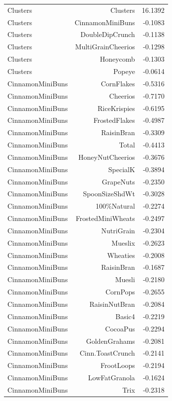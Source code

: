 \begin{longtable}{@{}lrr@{}}
Clusters & Clusters & 16.1392 \\
Clusters & CinnamonMiniBuns & -0.1083 \\
Clusters & DoubleDipCrunch & -0.1138 \\
Clusters & MultiGrainCheerios & -0.1298 \\
Clusters & Honeycomb & -0.1303 \\
Clusters & Popeye & -0.0614 \\
CinnamonMiniBuns & CornFlakes & -0.5316 \\
CinnamonMiniBuns & Cheerios & -0.7170 \\
CinnamonMiniBuns & RiceKrispies & -0.6195 \\
CinnamonMiniBuns & FrostedFlakes & -0.4987 \\
CinnamonMiniBuns & RaisinBran & -0.3309 \\
CinnamonMiniBuns & Total & -0.4413 \\
CinnamonMiniBuns & HoneyNutCheerios & -0.3676 \\
CinnamonMiniBuns & SpecialK & -0.3894 \\
CinnamonMiniBuns & GrapeNuts & -0.2350 \\
CinnamonMiniBuns & SpoonSizeShdWt & -0.3028 \\
CinnamonMiniBuns & 100\%Natural & -0.2274 \\
CinnamonMiniBuns & FrostedMiniWheats & -0.2497 \\
CinnamonMiniBuns & NutriGrain & -0.2304 \\
CinnamonMiniBuns & Mueslix & -0.2623 \\
CinnamonMiniBuns & Wheaties & -0.2008 \\
CinnamonMiniBuns & RaisinBran & -0.1687 \\
CinnamonMiniBuns & Muesli & -0.2180 \\
CinnamonMiniBuns & CornPops & -0.2655 \\
CinnamonMiniBuns & RaisinNutBran & -0.2084 \\
CinnamonMiniBuns & Basic4 & -0.2219 \\
CinnamonMiniBuns & CocoaPus & -0.2294 \\
CinnamonMiniBuns & GoldenGrahams & -0.2081 \\
CinnamonMiniBuns & Cinn.ToastCrunch & -0.2141 \\
CinnamonMiniBuns & FrootLoops & -0.2194 \\
CinnamonMiniBuns & LowFatGranola & -0.1624 \\
CinnamonMiniBuns & Trix & -0.2318 \\

\end{longtable}
